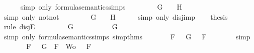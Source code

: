 \begin{isabellebody}
\ \ \ \ \isamarkupfalse%
\ {\isacharparenleft}simp\ only{\isacharcolon}\ formula{\isacharunderscore}semantics{\isachardot}simps{\isacharparenleft}{}{\isacharparenright}{\isacharparenright}\isanewline
\ \ \isamarkupfalse%
\ \isamarkupfalse%
\ {\isachardoublequoteopen}{\isacharparenleft}{\isasymnot}{\isacharparenleft}{\isasymnot}\ {\isasymA}\ {\isasymTurnstile}\ G{\isacharparenright}{\isacharparenright}\ {\isasymlongrightarrow}\ {\isasymA}\ {\isasymTurnstile}\ H{\isachardoublequoteclose}\isanewline
\ \ \ \ \isamarkupfalse%
\ {\isacharparenleft}simp\ only{\isacharcolon}\ not{\isacharunderscore}not{\isacharparenright}\isanewline
\ \ \isamarkupfalse%
\ \isamarkupfalse%
\ {\isachardoublequoteopen}{\isacharparenleft}{\isasymnot}\ {\isasymA}\ {\isasymTurnstile}\ G{\isacharparenright}\ {\isasymor}\ {\isasymA}\ {\isasymTurnstile}\ H{\isachardoublequoteclose}\isanewline
\ \ \ \ \isamarkupfalse%
\ {\isacharparenleft}simp\ only{\isacharcolon}\ disj{\isacharunderscore}imp{\isacharparenright}\isanewline
\ \ \isamarkupfalse%
\ {\isacharquery}thesis\isanewline
\ \ \isamarkupfalse%
\ {\isacharparenleft}rule\ disjE{\isacharparenright}\isanewline
\ \ \ \ \isamarkupfalse%
\ {\isachardoublequoteopen}{\isasymnot}\ {\isasymA}\ {\isasymTurnstile}\ G{\isachardoublequoteclose}\isanewline
\ \ \ \ \isamarkupfalse%
\ \isamarkupfalse%
\ {\isachardoublequoteopen}{\isasymA}\ {\isasymTurnstile}\ {\isacharparenleft}\isactrlbold {\isasymnot}\ G{\isacharparenright}{\isachardoublequoteclose}\isanewline
\ \ \ \ \ \ \isamarkupfalse%
\ {\isacharparenleft}simp\ only{\isacharcolon}\ formula{\isacharunderscore}semantics{\isachardot}simps{\isacharparenleft}{}{\isacharparenright}\ simp{\isacharunderscore}thms{\isacharparenleft}{}{\isacharparenright}{\isacharparenright}\isanewline
\ \ \ \ \isamarkupfalse%
\ \isamarkupfalse%
\ {\isachardoublequoteopen}{\isasymforall}F\ {\isasymin}\ {\isacharbraceleft}\isactrlbold {\isasymnot}\ G{\isacharbraceright}{\isachardot}\ {\isasymA}\ {\isasymTurnstile}\ F{\isachardoublequoteclose}\isanewline
\ \ \ \ \ \ \isamarkupfalse%
\ simp\isanewline
\ \ \ \ \isamarkupfalse%
\ \isamarkupfalse%
\ {\isachardoublequoteopen}{\isasymforall}F\ {\isasymin}\ {\isacharparenleft}{\isacharbraceleft}\isactrlbold {\isasymnot}\ G{\isacharbraceright}\ {\isasymunion}\ {\isacharparenleft}{\isacharbraceleft}F{\isacharbraceright}\ {\isasymunion}\ Wo{\isacharparenright}{\isacharparenright}{\isachardot}\ {\isasymA}\ {\isasymTurnstile}\ F{\isachardoublequoteclose}\isanewline

\end{isabellebody}
